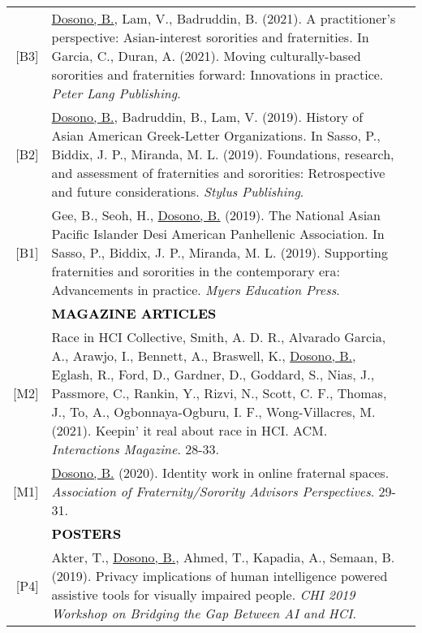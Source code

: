 \documentclass[11pt]{article}
\begin{document}
{{\begin{longtable}{Rp{0.75in}p{5.0in}}
\footnotesize{[B3]} & \href{https://www.google.com/books/edition/Moving_Culturally_Based_Sororities_and_F/XwdXzgEACAAJ}{Dosono, B.}, Lam, V., Badruddin, B. (2021). A practitioner's perspective: Asian-interest sororities and fraternities. In Garcia, C., Duran, A. (2021). Moving culturally-based sororities and fraternities forward: Innovations in practice. \textit{Peter Lang Publishing}.\\

\footnotesize{[B2]} & \href{https://books.google.com/books?id=hjDEDwAAQBAJ&pg=PT64}{Dosono, B.}, Badruddin, B., Lam, V. (2019). History of Asian American Greek-Letter Organizations. In Sasso, P., Biddix, J. P., Miranda, M. L. (2019). Foundations, research, and assessment of fraternities and sororities: Retrospective and future considerations. \textit{Stylus Publishing}.\\

\footnotesize{[B1]} & Gee, B., Seoh, H., \href{https://www.google.com/books/edition/_/HD1YyAEACAAJ}{Dosono, B.} (2019). The National Asian Pacific Islander Desi American Panhellenic Association. In Sasso, P., Biddix, J. P., Miranda, M. L. (2019). Supporting fraternities and sororities in the contemporary era: Advancements in practice. \textit{Myers Education Press}.\\

& \textcolor{black}{\uppercase{\textbf{Magazine Articles}}}\\

\footnotesize{[M2]} & {Race in HCI Collective, Smith, A. D. R., Alvarado Garcia, A., Arawjo, I., Bennett, A., Braswell, K., \href{https://dl.acm.org/doi/10.1145/3477097?cid=88158835957}{Dosono, B.}, Eglash, R., Ford, D., Gardner, D., Goddard, S., Nias, J.,  Passmore, C., Rankin, Y., Rizvi, N., Scott, C. F., Thomas, J., To, A., Ogbonnaya-Ogburu, I. F., Wong-Villacres, M.} (2021). Keepin' it real about race in HCI. ACM. \textit{Interactions Magazine}. 28-33.\\

\footnotesize{[M1]} & \href{https://issuu.com/afa1976/docs/afa-perspectives-2019-issue4-final-nobleed}{Dosono, B.} (2020). Identity work in online fraternal spaces. \textit{Association of Fraternity/Sorority Advisors Perspectives}. 29-31.\\

& \textcolor{black}{\uppercase{\textbf{Posters}}}\\

\footnotesize{[P4]} & Akter, T., \href{https://www.usenix.org/sites/default/files/soups2019posters-akter.pdf}{Dosono, B.}, Ahmed, T., Kapadia, A., Semaan, B. (2019). Privacy implications of human intelligence powered assistive tools for visually impaired people. \textit{CHI 2019 Workshop on Bridging the Gap Between AI and HCI}.\\


\end{longtable}}}
\end{document}
